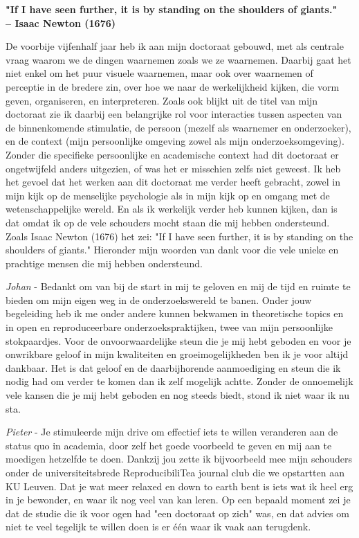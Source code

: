 \noindent
\begin{center}
\textbf{"If I have seen further, it is by standing on the shoulders of giants." \\ -- Isaac Newton (1676)}
\end{center}
\thispagestyle{empty}

\clearpage

De voorbije vijfenhalf jaar heb ik aan mijn doctoraat gebouwd, met als centrale vraag waarom we de dingen waarnemen zoals we ze waarnemen. Daarbij gaat het niet enkel om het puur visuele waarnemen, maar ook over waarnemen of perceptie in de bredere zin, over hoe we naar de werkelijkheid kijken, die vorm geven, organiseren, en interpreteren. Zoals ook blijkt uit de titel van mijn doctoraat zie ik daarbij een belangrijke rol voor interacties tussen aspecten van de binnenkomende stimulatie, de persoon (mezelf als waarnemer en onderzoeker), en de context (mijn persoonlijke omgeving zowel als mijn onderzoeksomgeving). Zonder die specifieke persoonlijke en academische context had dit doctoraat er ongetwijfeld anders uitgezien, of was het er misschien zelfs niet geweest. Ik heb het gevoel dat het werken aan dit doctoraat me verder heeft gebracht, zowel in mijn kijk op de menselijke psychologie als in mijn kijk op en omgang met de wetenschappelijke wereld. En als ik werkelijk verder heb kunnen kijken, dan is dat omdat ik op de vele schouders mocht staan die mij hebben ondersteund. Zoals Isaac Newton (1676) het zei: "If I have seen further, it is by standing on the shoulders of giants." Hieronder mijn woorden van dank voor die vele unieke en prachtige mensen die mij hebben ondersteund.

\textit{Johan} - Bedankt om van bij de start in mij te geloven en mij de tijd en ruimte te bieden om mijn eigen weg in de onderzoekswereld te banen. Onder jouw begeleiding heb ik me onder andere kunnen bekwamen in theoretische topics en in open en reproduceerbare onderzoekspraktijken, twee van mijn persoonlijke stokpaardjes. Voor de onvoorwaardelijke steun die je mij hebt geboden en voor je onwrikbare geloof in mijn kwaliteiten en groeimogelijkheden ben ik je voor altijd dankbaar. Het is dat geloof en de daarbijhorende aanmoediging en steun die ik nodig had om verder te komen dan ik zelf mogelijk achtte. Zonder de onnoemelijk vele kansen die je mij hebt geboden en nog steeds biedt, stond ik niet waar ik nu sta.

\textit{Pieter} - Je stimuleerde mijn drive om effectief iets te willen veranderen aan de status quo in academia, door zelf het goede voorbeeld te geven en mij aan te moedigen hetzelfde te doen. Dankzij jou zette ik bijvoorbeeld mee mijn schouders onder de universiteitsbrede ReproducibiliTea journal club die we opstartten aan KU Leuven. Dat je wat meer relaxed en down to earth bent is iets wat ik heel erg in je bewonder, en waar ik nog veel van kan leren. Op een bepaald moment zei je dat de studie die ik voor ogen had "een doctoraat op zich" was, en dat advies om niet te veel tegelijk te willen doen is er één waar ik vaak aan terugdenk.  

